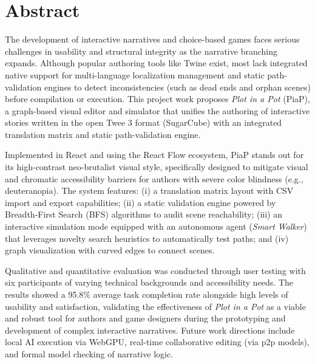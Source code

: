 \MediaOptionLogicBlank

\chapter*{Abstract}

The development of interactive narratives and choice-based games faces serious challenges in usability and structural integrity as the narrative branching expands. Although popular authoring tools like Twine exist, most lack integrated native support for multi-language localization management and static path-validation engines to detect inconsistencies (such as dead ends and orphan scenes) before compilation or execution. This project work proposes \textit{Plot in a Pot} (PiaP), a graph-based visual editor and simulator that unifies the authoring of interactive stories written in the open Twee 3 format (SugarCube) with an integrated translation matrix and static path-validation engine.

Implemented in React and using the React Flow ecosystem, PiaP stands out for its high-contrast neo-brutalist visual style, specifically designed to mitigate visual and chromatic accessibility barriers for authors with severe color blindness (e.g., deuteranopia). The system features: (i) a translation matrix layout with CSV import and export capabilities; (ii) a static validation engine powered by Breadth-First Search (BFS) algorithms to audit scene reachability; (iii) an interactive simulation mode equipped with an autonomous agent (\textit{Smart Walker}) that leverages novelty search heuristics to automatically test paths; and (iv) graph visualization with curved edges to connect scenes.

Qualitative and quantitative evaluation was conducted through user testing with six participants of varying technical backgrounds and accessibility needs. The results showed a 95.8\% average task completion rate alongside high levels of usability and satisfaction, validating the effectiveness of \textit{Plot in a Pot} as a viable and robust tool for authors and game designers during the prototyping and development of complex interactive narratives. Future work directions include local AI execution via WebGPU, real-time collaborative editing (via \gls{p2p} models), and formal model checking of narrative logic.


\MediaOptionLogicBlank